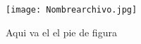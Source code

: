 \begin{figure}[H]
\centering
\texttt{[image: Nombrearchivo.jpg]}
\begin{quote}
\caption{Aqui va el el pie de figura}
\end{quote}
\end{figure}

